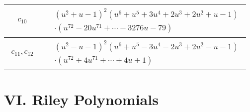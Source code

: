 \documentclass[1p]{elsarticle_modified}
\theoremstyle{definition}
\begin{document}
\begin{tabular}{m{50pt}|m{274pt}}
\hline $$\begin{aligned}c_{10}\end{aligned}$$&$\begin{aligned}
&(u^2+u-1)^2(u^6+u^5+3 u^4+2 u^3+2 u^2+u-1)\\
&\cdot(u^{72}-20 u^{71}+\cdots-3276 u-79)
\end{aligned}$\\
\hline $$\begin{aligned}c_{11},c_{12}\end{aligned}$$&$\begin{aligned}
&(u^2- u-1)^2(u^6+u^5-3 u^4-2 u^3+2 u^2- u-1)\\
&\cdot(u^{72}+4 u^{71}+\cdots+4 u+1)
\end{aligned}$\\
\hline
\end{tabular}\newpage\renewcommand{\arraystretch}{1}
\centering \section*{ VI. Riley Polynomials}
\end{document}
